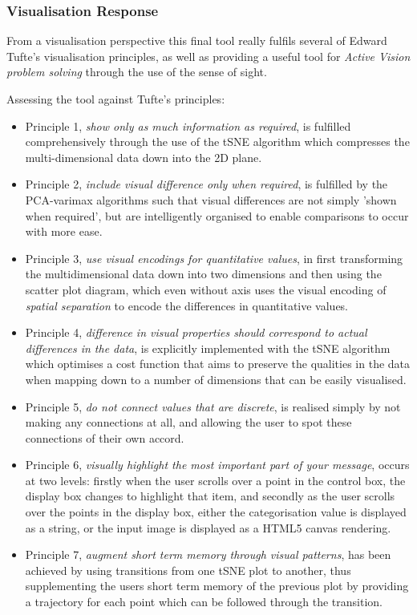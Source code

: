 \documentclass[a4paper,11pt,titlepage]{article}
\begin{document}
	\subsubsection{Visualisation Response}
	From a visualisation perspective this final tool really fulfils several of Edward Tufte's visualisation principles, as well as providing a useful tool for \textit{Active Vision problem solving} through the use of the sense of sight. 
	\par 
	Assessing the tool against Tufte's principles:
	\begin{itemize}
		\item Principle 1, \textit{show only as much information as required}, is fulfilled comprehensively through the use of the tSNE algorithm which compresses the multi-dimensional data down into the 2D plane.
		\item Principle 2, \textit{include visual difference only when required}, is fulfilled by the PCA-varimax algorithms such that visual differences are not simply 'shown when required', but are intelligently organised to enable comparisons to occur with more ease.
		\item Principle 3, \textit{use visual encodings for quantitative values}, in first transforming the multidimensional data down into two dimensions and then using the scatter plot diagram, which even without axis uses the visual encoding of \textit{spatial separation} to encode the differences in quantitative values.
		\item Principle 4, \textit{difference in visual properties should correspond to actual differences in the data}, is explicitly implemented with the tSNE algorithm which optimises a cost function that aims to preserve the qualities in the data when mapping down to a number of dimensions that can be easily visualised. 
		\item Principle 5, \textit{do not connect values that are discrete}, is realised simply by not making any connections at all, and allowing the user to spot these connections of their own accord.
		\item Principle 6, \textit{visually highlight the most important part of your message}, occurs at two levels: firstly when the user scrolls over a point in the control box, the display box changes to highlight that item, and secondly as the user scrolls over the points in the display box, either the categorisation value is displayed as a string, or the input image is displayed as a HTML5 canvas rendering. 
		\item Principle 7, \textit{augment short term memory through visual patterns}, has been achieved by using transitions from one tSNE plot to another, thus supplementing the users short term memory of the previous plot by providing a trajectory for each point which can be followed through the transition.

\end{itemize}
\end{document}
